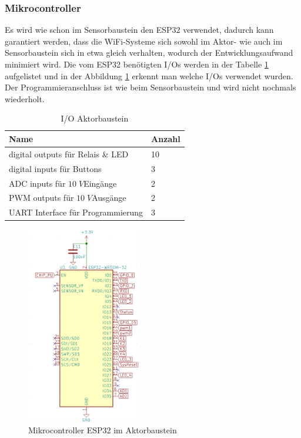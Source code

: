 \subsubsection{Mikrocontroller}\label{Hardware Mikrocontroller_Aktor}
Es wird wie schon im Sensorbaustein den ESP32 verwendet, dadurch kann garantiert werden, dass die WiFi-Systeme sich sowohl im Aktor- wie auch im Sensorbaustein sich in etwa gleich verhalten, wodurch der Entwicklungsaufwand minimiert wird. Die vom ESP32 benötigten I/Os werden in der Tabelle \ref{tab: IO Aktorbaustein} aufgelistet und in der Abbildung \ref{pic: ESP32_aktor} erkennt man welche I/Os verwendet wurden. Der Programmieranschluss ist wie beim Sensorbaustein und wird nicht nochmals wiederholt.
\begin{table}[h!]
	\centering
	\begin{tabular}{|l|l|}
		\hline
		\textbf{Name}                      & \textbf{Anzahl} \\ \hline
		digital outputs für Relais \& LED  & 10              \\ \hline
		digital inputs für Buttons         & 3               \\ \hline
		ADC inputs für \glqq $10\;V$\grqq Eingänge  & 2      \\ \hline
		PWM outputs für \glqq$10\;V$\grqq Ausgänge & 2       \\ \hline
		UART Interface für Programmierung  & 3               \\ \hline
	\end{tabular}
	\caption{I/O Aktorbaustein}
	\label{tab: IO Aktorbaustein}
\end{table}
\begin{figure}[h!]
	\centering
	\includegraphics[width=0.45\textwidth]{graphics/shematics_aktor_ESP32.png}
	\caption{Mikrocontroller ESP32 im Aktorbaustein}
	\label{pic: ESP32_aktor}
\end{figure}


